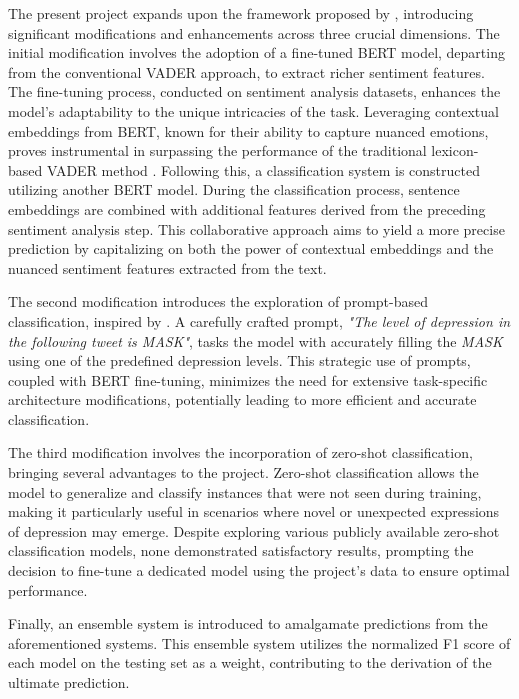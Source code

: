 \documentclass{article}
\begin{document}
The present project expands upon the framework proposed by \citep{wang2022nycu_twd}, introducing significant modifications and enhancements across three crucial dimensions. The initial modification involves the adoption of a fine-tuned BERT model, departing from the conventional VADER approach, to extract richer sentiment features. The fine-tuning process, conducted on sentiment analysis datasets, enhances the model's adaptability to the unique intricacies of the task. Leveraging contextual embeddings from BERT, known for their ability to capture nuanced emotions, proves instrumental in surpassing the performance of the traditional lexicon-based VADER method \citep{saha2022vader}. Following this, a classification system is constructed utilizing another BERT model. During the classification process, sentence embeddings are combined with additional features derived from the preceding sentiment analysis step. This collaborative approach aims to yield a more precise prediction by capitalizing on both the power of contextual embeddings and the nuanced sentiment features extracted from the text.

The second modification introduces the exploration of prompt-based classification, inspired by \citep{deng2022beike}. A carefully crafted prompt, \emph{"The level of depression in the following tweet is {MASK}"}, tasks the model with accurately filling the \emph{MASK} using one of the predefined depression levels. This strategic use of prompts, coupled with BERT fine-tuning, minimizes the need for extensive task-specific architecture modifications, potentially leading to more efficient and accurate classification.

The third modification involves the incorporation of zero-shot classification, bringing several advantages to the project. Zero-shot classification allows the model to generalize and classify instances that were not seen during training, making it particularly useful in scenarios where novel or unexpected expressions of depression may emerge. Despite exploring various publicly available zero-shot classification models, none demonstrated satisfactory results, prompting the decision to fine-tune a dedicated model using the project's data to ensure optimal performance.

Finally, an ensemble system is introduced to amalgamate predictions from the aforementioned systems. This ensemble system utilizes the normalized F1 score of each model on the testing set as a weight, contributing to the derivation of the ultimate prediction.
\end{document}
